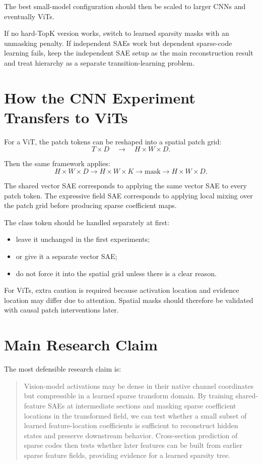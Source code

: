 \documentclass[11pt]{article}
\begin{document}
The best small-model configuration should then be scaled to larger CNNs and eventually ViTs.

If no hard-TopK version works, switch to learned sparsity masks with an unmasking penalty. If independent SAEs work but dependent sparse-code learning fails, keep the independent SAE setup as the main reconstruction result and treat hierarchy as a separate transition-learning problem.

\section{How the CNN Experiment Transfers to ViTs}

For a ViT, the patch tokens can be reshaped into a spatial patch grid:
\[
T \times D
\quad\rightarrow\quad
H \times W \times D.
\]

Then the same framework applies:
\[
H \times W \times D
\rightarrow
H \times W \times K
\rightarrow
\text{mask}
\rightarrow
H \times W \times D.
\]

The shared vector SAE corresponds to applying the same vector SAE to every patch token. The expressive field SAE corresponds to applying local mixing over the patch grid before producing sparse coefficient maps.

The class token should be handled separately at first:
\begin{itemize}[leftmargin=*]
    \item leave it unchanged in the first experiments;
    \item or give it a separate vector SAE;
    \item do not force it into the spatial grid unless there is a clear reason.
\end{itemize}

For ViTs, extra caution is required because activation location and evidence location may differ due to attention. Spatial masks should therefore be validated with causal patch interventions later.

\section{Main Research Claim}

The most defensible research claim is:

\begin{quote}
Vision-model activations may be dense in their native channel coordinates but compressible in a learned sparse transform domain. By training shared-feature SAEs at intermediate sections and masking sparse coefficient locations in the transformed field, we can test whether a small subset of learned feature-location coefficients is sufficient to reconstruct hidden states and preserve downstream behavior. Cross-section prediction of sparse codes then tests whether later features can be built from earlier sparse feature fields, providing evidence for a learned sparsity tree.
\end{quote}
\end{document}
